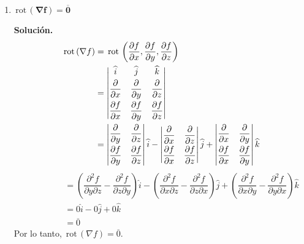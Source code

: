 \documentclass[fleqn, 12pt]{article}
\newcommand{\derivadaparcial}[2]{\dfrac{\partial {#1}}{\partial {#2}}}
\newcommand{\derivadaparcialnd}[3]{\dfrac{\partial^{2} {#1}}{\partial {#3} \partial {#2}}}
\newcommand{\rot}{\mathrm{\, rot \,}}
\begin{document}
\begin{enumerate}
        \item $ \mathbf{\rot (\nabla f) = \overline{0}} $
        
        \textbf{Solución.}
        \begin{align*}
            \rot (\nabla f) &= \rot \left( \derivadaparcial{f}{x}, \derivadaparcial{f}{y}, \derivadaparcial{f}{z} \right) \\
            &= \left\lvert 
            \begin{matrix}
                \widehat{i} & \widehat{j} & \widehat{k} \vspace{1mm} \\
                \derivadaparcial{}{x} & \derivadaparcial{}{y} & \derivadaparcial{}{z} \vspace{1mm} \\
                \derivadaparcial{f}{x} & \derivadaparcial{f}{y} & \derivadaparcial{f}{z}
            \end{matrix} \right\rvert \\
            &= \left\rvert 
            \begin{matrix}
                \derivadaparcial{}{y} & \derivadaparcial{}{z} \vspace{1mm} \\
                \derivadaparcial{f}{y} & \derivadaparcial{f}{z}
            \end{matrix}
            \right\rvert \widehat{i} -
            \left\rvert 
            \begin{matrix}
                \derivadaparcial{}{x} & \derivadaparcial{}{z} \vspace{1mm} \\
                \derivadaparcial{f}{x} & \derivadaparcial{f}{z}
            \end{matrix}
            \right\rvert \widehat{j} +
            \left\rvert 
            \begin{matrix}
                \derivadaparcial{}{x} & \derivadaparcial{}{y} \vspace{1mm} \\
                \derivadaparcial{f}{x} & \derivadaparcial{f}{y}
            \end{matrix}
            \right\rvert \widehat{k}
        \end{align*}
        \begin{align*}
            \qquad \qquad &= \left( \derivadaparcialnd{f}{z}{y} - \derivadaparcialnd{f}{y}{z} \right) \widehat{i} - \left( \derivadaparcialnd{f}{z}{x} - \derivadaparcialnd{f}{x}{z} \right) \widehat{j} + \left( \derivadaparcialnd{f}{y}{x} - \derivadaparcialnd{f}{x}{y} \right) \widehat{k} \\
            &= 0 \widehat{i} - 0 \widehat{j} + 0 \widehat{k} \\
            &= \overline{0}
        \end{align*}
        Por lo tanto, $ \rot (\nabla f) = \overline{0} $. \\


\end{enumerate}
\end{document}
